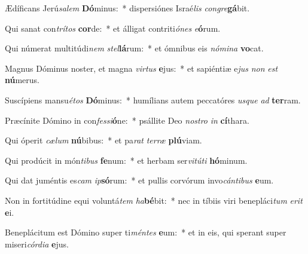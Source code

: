 \item Ædíficans Jerú\textit{sa}\textit{lem} \textbf{Dó}minus:~* dispersiónes Israé\textit{lis} \textit{con}\textit{gre}\textbf{gá}bit.
\item Qui sanat con\textit{trí}\textit{tos} \textbf{cor}de:~* et álligat contriti\textit{ó}\textit{nes} \textit{e}\textbf{ó}rum.
\item Qui númerat multitúdi\textit{nem} \textit{stel}\textbf{lá}rum:~* et ómnibus eis \textit{nó}\textit{mi}\textit{na} \textbf{vo}cat.
\item Magnus Dóminus noster, et magna \textit{vir}\textit{tus} \textbf{e}jus:~* et sapiéntiæ e\textit{jus} \textit{non} \textit{est} \textbf{nú}merus.
\item Suscípiens mansu\textit{é}\textit{tos} \textbf{Dó}minus:~* humílians autem peccatóres \textit{us}\textit{que} \textit{ad} \textbf{ter}ram.
\item Præcínite Dómino in con\textit{fes}\textit{si}\textbf{ó}ne:~* psállite Deo \textit{nos}\textit{tro} \textit{in} \textbf{cí}thara.
\item Qui óperit \textit{cæ}\textit{lum} \textbf{nú}bibus:~* et pa\textit{rat} \textit{ter}\textit{ræ} \textbf{plú}viam.
\item Qui prodúcit in món\textit{ti}\textit{bus} \textbf{fe}num:~* et herbam ser\textit{vi}\textit{tú}\textit{ti} \textbf{hó}minum.
\item Qui dat juméntis es\textit{cam} \textit{ip}\textbf{só}rum:~* et pullis corvórum invo\textit{cán}\textit{ti}\textit{bus} \textbf{e}um.
\item Non in fortitúdine equi voluntá\textit{tem} \textit{ha}\textbf{bé}bit:~* nec in tíbiis viri benepláci\textit{tum} \textit{e}\textit{rit} \textbf{e}i.
\item Beneplácitum est Dómino super ti\textit{mén}\textit{tes} \textbf{e}um:~* et in eis, qui sperant super miseri\textit{cór}\textit{di}\textit{a} \textbf{e}jus.
